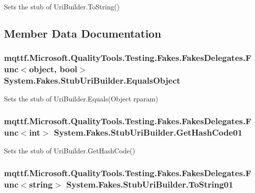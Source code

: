 Sets the stub of Uri\-Builder.\-To\-String()



\subsection{Member Data Documentation}
\hypertarget{class_system_1_1_fakes_1_1_stub_uri_builder_a7977b009d26a7dc9a16ab9d6bc264d37}{
\subsubsection[{Equals\-Object}]{\setlength{\rightskip}{0pt plus 5cm}mqttf.\-Microsoft.\-Quality\-Tools.\-Testing.\-Fakes.\-Fakes\-Delegates.\-Func$<$object, bool$>$ System.\-Fakes.\-Stub\-Uri\-Builder.\-Equals\-Object}}\label{class_system_1_1_fakes_1_1_stub_uri_builder_a7977b009d26a7dc9a16ab9d6bc264d37}


Sets the stub of Uri\-Builder.\-Equals(\-Object rparam)

\hypertarget{class_system_1_1_fakes_1_1_stub_uri_builder_a13fd9e4cf8c053b0d273ffcfb61d854a}{
\subsubsection[{Get\-Hash\-Code01}]{\setlength{\rightskip}{0pt plus 5cm}mqttf.\-Microsoft.\-Quality\-Tools.\-Testing.\-Fakes.\-Fakes\-Delegates.\-Func$<$int$>$ System.\-Fakes.\-Stub\-Uri\-Builder.\-Get\-Hash\-Code01}}\label{class_system_1_1_fakes_1_1_stub_uri_builder_a13fd9e4cf8c053b0d273ffcfb61d854a}


Sets the stub of Uri\-Builder.\-Get\-Hash\-Code()

\hypertarget{class_system_1_1_fakes_1_1_stub_uri_builder_a1db80d6fe85ffca8042efe77e03ed41f}{
\subsubsection[{To\-String01}]{\setlength{\rightskip}{0pt plus 5cm}mqttf.\-Microsoft.\-Quality\-Tools.\-Testing.\-Fakes.\-Fakes\-Delegates.\-Func$<$string$>$ System.\-Fakes.\-Stub\-Uri\-Builder.\-To\-String01}}\label{class_system_1_1_fakes_1_1_stub_uri_builder_a1db80d6fe85ffca8042efe77e03ed41f}



